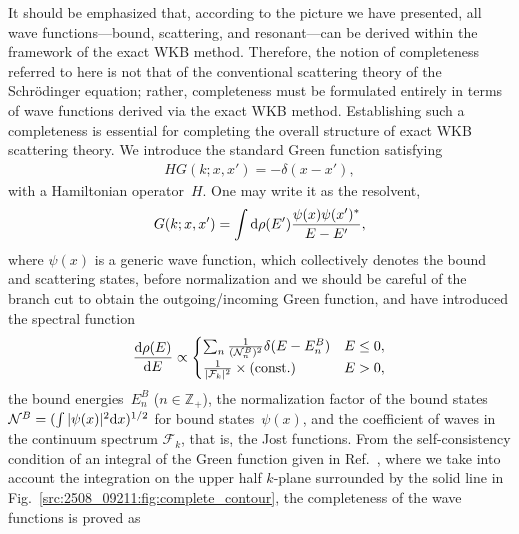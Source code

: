 It should be emphasized that, according to the picture we have presented, all wave functions---bound, scattering, and resonant---can be derived within the framework of the exact WKB method. Therefore, the notion of completeness referred to here is not that of the conventional scattering theory of the Schr\"odinger equation; rather, completeness must be formulated entirely in terms of wave functions derived via the exact WKB method. Establishing such a completeness is essential for completing the overall structure of exact WKB scattering theory.
We introduce the standard Green function satisfying
\begin{align}
    H G(k;x,x') = -\delta(x-x') ,
\end{align}
with a Hamiltonian operator~$H$.
One may write it as the resolvent,
\begin{align}
    G(k;x,x') = \int \mathrm{d} \rho(E') \frac{\psi(x)\psi(x')^*}{E-E'} ,
    \label{src:2508_09211:eq:resolvent}
\end{align}
where $\psi(x)$ is a generic wave function, which collectively denotes the bound and scattering states, before normalization and we should be careful of the branch cut to obtain the outgoing/incoming Green function, and have introduced the spectral function
\begin{align}
    \frac{\mathrm{d} \rho(E)}{\mathrm{d} E} \propto
    \begin{cases}
        \sum_{n} \frac{1}{(\mathcal{N}_n^B)^2} \delta(E-E_n^B) & E\leq0,\\
        \frac{1}{|\mathcal{F}_k|^2} \times (\mathrm{const.}) & E>0 ,
    \end{cases}
\end{align}
the bound energies~$E_n^B$ ($n\in\mathbb{Z}_+$), the normalization factor of the bound states $\mathcal{N}^B=(\int|\psi(x)|^2\mathrm{d} x)^{1/2}$ for bound states~$\psi(x)$, and the coefficient of waves in the continuum spectrum $\mathcal{F}_k$, that is, the Jost functions.
From the self-consistency condition of an integral of the Green function given in Ref.~\cite{Newton:1960}, where we take into account the integration on the upper half $k$-plane surrounded by the solid line in Fig.~\ref{src:2508_09211:fig:complete_contour}, the completeness of the wave functions is proved as
